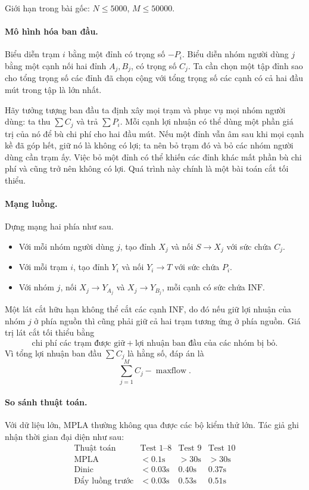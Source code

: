 \documentclass[11pt]{article}
\newcommand{\inftycap}{\mathrm{INF}}
\begin{document}
Giới hạn trong bài gốc: \(N\le 5000\), \(M\le 50000\).

\paragraph{Mô hình hóa ban đầu.}
Biểu diễn trạm \(i\) bằng một đỉnh có trọng số \(-P_i\). Biểu diễn nhóm người
dùng \(j\) bằng một cạnh nối hai đỉnh \(A_j,B_j\), có trọng số \(C_j\). Ta cần
chọn một tập đỉnh sao cho tổng trọng số các đỉnh đã chọn cộng với tổng trọng
số các cạnh có cả hai đầu mút trong tập là lớn nhất.

Hãy tưởng tượng ban đầu ta định xây mọi trạm và phục vụ mọi nhóm người dùng:
ta thu \(\sum C_j\) và trả \(\sum P_i\). Mỗi cạnh lợi nhuận có thể dùng một
phần giá trị của nó để bù chi phí cho hai đầu mút. Nếu một đỉnh vẫn âm sau khi
mọi cạnh kề đã góp hết, giữ nó là không có lợi; ta nên bỏ trạm đó và bỏ các
nhóm người dùng cần trạm ấy. Việc bỏ một đỉnh có thể khiến các đỉnh khác mất
phần bù chi phí và cũng trở nên không có lợi. Quá trình này chính là một bài
toán cắt tối thiểu.

\paragraph{Mạng luồng.}
Dựng mạng hai phía như sau.
\begin{itemize}
  \item Với mỗi nhóm người dùng \(j\), tạo đỉnh \(X_j\) và nối
  \(S\to X_j\) với sức chứa \(C_j\).
  \item Với mỗi trạm \(i\), tạo đỉnh \(Y_i\) và nối \(Y_i\to T\) với sức chứa
  \(P_i\).
  \item Với nhóm \(j\), nối \(X_j\to Y_{A_j}\) và \(X_j\to Y_{B_j}\), mỗi cạnh
  có sức chứa \(\inftycap\).
\end{itemize}

Một lát cắt hữu hạn không thể cắt các cạnh \(\inftycap\), do đó nếu giữ lợi
nhuận của nhóm \(j\) ở phía nguồn thì cũng phải giữ cả hai trạm tương ứng ở
phía nguồn. Giá trị lát cắt tối thiểu bằng
\[
  \text{chi phí các trạm được giữ}
  + \text{lợi nhuận ban đầu của các nhóm bị bỏ}.
\]
Vì tổng lợi nhuận ban đầu \(\sum C_j\) là hằng số, đáp án là
\[
  \sum_{j=1}^{M} C_j - \operatorname{maxflow}.
\]

\paragraph{So sánh thuật toán.}
Với dữ liệu lớn, MPLA thường không qua được các bộ kiểm thử lớn. Tác giả ghi
nhận thời gian đại diện như sau:
\[
\begin{array}{c|ccc}
\text{Thuật toán} & \text{Test 1--8} & \text{Test 9} & \text{Test 10}\\
\hline
\text{MPLA} & <0.1\text{s} & >30\text{s} & >30\text{s}\\
\text{Dinic} & <0.03\text{s} & 0.40\text{s} & 0.37\text{s}\\
\text{Đẩy luồng trước} & <0.03\text{s} & 0.53\text{s} & 0.51\text{s}
\end{array}
\]
\end{document}
